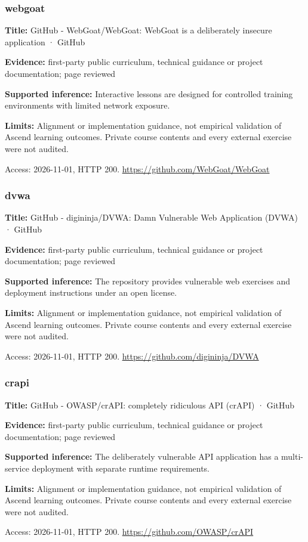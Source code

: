 \subsubsection{webgoat}
\noindent\textbf{Title:} GitHub - WebGoat/WebGoat: WebGoat is a deliberately insecure application · GitHub\par
\noindent\textbf{Evidence:} first-party public curriculum, technical guidance or project documentation; page reviewed\par
\noindent\textbf{Supported inference:} Interactive lessons are designed for controlled training environments with limited network exposure.\par
\noindent\textbf{Limits:} Alignment or implementation guidance, not empirical validation of Ascend learning outcomes. Private course contents and every external exercise were not audited.\par
\noindent Access: 2026-11-01, HTTP 200. \url{https://github.com/WebGoat/WebGoat}
\subsubsection{dvwa}
\noindent\textbf{Title:} GitHub - digininja/DVWA: Damn Vulnerable Web Application (DVWA) · GitHub\par
\noindent\textbf{Evidence:} first-party public curriculum, technical guidance or project documentation; page reviewed\par
\noindent\textbf{Supported inference:} The repository provides vulnerable web exercises and deployment instructions under an open license.\par
\noindent\textbf{Limits:} Alignment or implementation guidance, not empirical validation of Ascend learning outcomes. Private course contents and every external exercise were not audited.\par
\noindent Access: 2026-11-01, HTTP 200. \url{https://github.com/digininja/DVWA}
\subsubsection{crapi}
\noindent\textbf{Title:} GitHub - OWASP/crAPI: completely ridiculous API (crAPI) · GitHub\par
\noindent\textbf{Evidence:} first-party public curriculum, technical guidance or project documentation; page reviewed\par
\noindent\textbf{Supported inference:} The deliberately vulnerable API application has a multi-service deployment with separate runtime requirements.\par
\noindent\textbf{Limits:} Alignment or implementation guidance, not empirical validation of Ascend learning outcomes. Private course contents and every external exercise were not audited.\par
\noindent Access: 2026-11-01, HTTP 200. \url{https://github.com/OWASP/crAPI}
